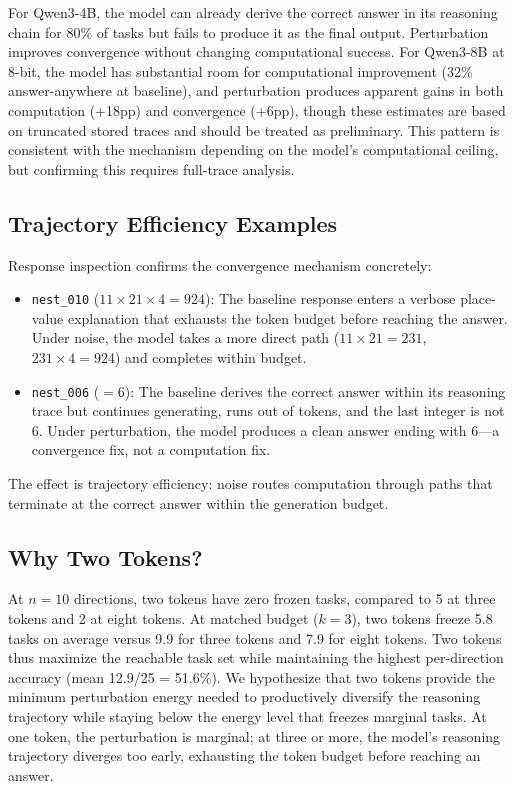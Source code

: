 \documentclass{article}
\begin{document}
For Qwen3-4B, the model can already derive the correct answer in its
reasoning chain for 80\% of tasks but fails to produce it as the
final output. Perturbation improves convergence without changing
computational success. For Qwen3-8B at 8-bit, the model has substantial
room for computational improvement (32\% answer-anywhere at baseline),
and perturbation produces apparent gains in both computation (+18pp)
and convergence (+6pp), though these estimates are based on truncated
stored traces and should be treated as preliminary. This pattern is
consistent with the mechanism depending on the model's computational
ceiling, but confirming this requires full-trace analysis.

\subsection{Trajectory Efficiency Examples}

Response inspection confirms the convergence mechanism concretely:
\begin{itemize}
    \item \texttt{nest\_010} ($11 \times 21 \times 4 = 924$): The
    baseline response enters a verbose place-value explanation that
    exhausts the token budget before reaching the answer. Under noise,
    the model takes a more direct path ($11 \times 21 = 231$,
    $231 \times 4 = 924$) and completes within budget.
    \item \texttt{nest\_006} ($= 6$): The baseline derives the correct
    answer within its reasoning trace but continues generating,
    runs out of tokens, and the last integer is not 6. Under perturbation,
    the model produces a clean answer ending with $\boxed{6}$---a
    convergence fix, not a computation fix.
\end{itemize}
The effect is trajectory efficiency: noise routes computation through
paths that terminate at the correct answer within the generation budget.

\subsection{Why Two Tokens?}

At $n = 10$ directions, two tokens have zero frozen tasks, compared to
5 at three tokens and 2 at eight tokens. At matched budget ($k = 3$),
two tokens freeze 5.8 tasks on average versus 9.9 for three tokens
and 7.9 for eight tokens. Two tokens thus maximize the reachable task
set while maintaining the highest per-direction accuracy
(mean 12.9/25 = 51.6\%). We hypothesize that two tokens provide the
minimum perturbation energy needed to productively diversify the
reasoning trajectory while staying below the energy level that
freezes marginal tasks. At one token, the perturbation is marginal;
at three or more, the model's reasoning trajectory diverges too early,
exhausting the token budget before reaching an answer.
\end{document}
